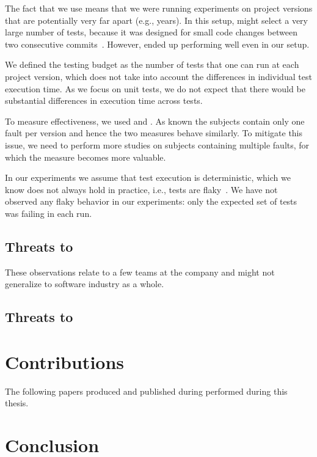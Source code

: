 The fact that we use \dfj means that we were running experiments on
project versions that are potentially very far apart (e.g., years).
In this setup, \ek might select a very large number of tests, because
it was designed for small code changes between two
consecutive commits~\cite{gligoricEk, VasicETAL17EkstaziSharp}.  However, 
\ek ended up performing well
even in our setup.

We defined the testing budget as the number of tests that one can run
at each project version, which does not take into account the
differences in individual test execution time.  As we focus on unit
tests, we do not expect that there would be substantial differences in
execution time across tests.

To measure effectiveness, we used \ttff and \apfd. As known the \dfj subjects contain only one fault per version and hence the two measures behave similarly. 
To mitigate this issue, we need to perform more studies on subjects containing multiple faults, for which the \apfd measure becomes more valuable. 

In our experiments we assume that test execution is deterministic,
which we know  does not always hold in practice, i.e.,
tests are flaky~\cite{luo2014empirical,harman2018start}.  We have not observed any flaky behavior in our
experiments: only the expected set of tests was failing in each run.

\subsection{Threats to  }

These observations relate to a few teams at the company and might not generalize to software industry as a whole.

\subsection{Threats to  }

\section{Contributions}

The following papers produced and published during performed during this thesis.



%

\section{Conclusion}